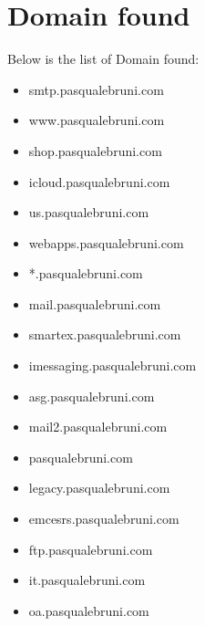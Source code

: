 \documentclass{article}
\begin{document}
\clearpage

\section{Domain found}

Below is the list of Domain found:

\begin{itemize}
    
        
            \item smtp.pasqualebruni.com
        
            \item www.pasqualebruni.com
        
            \item shop.pasqualebruni.com
        
            \item icloud.pasqualebruni.com
        
            \item us.pasqualebruni.com
        
            \item webapps.pasqualebruni.com
        
            \item *.pasqualebruni.com
        
            \item mail.pasqualebruni.com
        
            \item smartex.pasqualebruni.com
        
            \item imessaging.pasqualebruni.com
        
            \item asg.pasqualebruni.com
        
            \item mail2.pasqualebruni.com
        
            \item pasqualebruni.com
        
            \item legacy.pasqualebruni.com
        
            \item emcesrs.pasqualebruni.com
        
            \item ftp.pasqualebruni.com
        
            \item it.pasqualebruni.com
        
            \item oa.pasqualebruni.com
        
    
\end{itemize}
\end{document}
